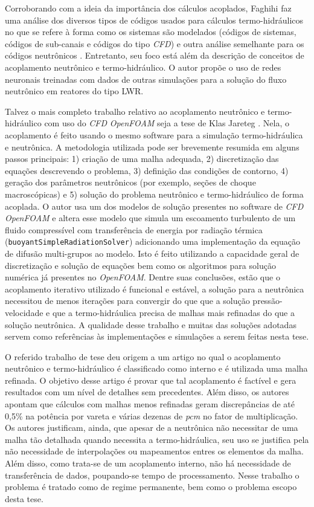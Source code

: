 Corroborando com a ideia da importância dos cálculos acoplados, Faghihi faz uma análise
dos diversos tipos de códigos usados para cálculos termo-hidráulicos no que se refere à
forma como os sistemas são modelados (códigos de sistemas, códigos de sub-canais e códigos
do tipo \textit{CFD}) e outra análise semelhante para os códigos neutrônicos \cite{Faghihi2011}. Entretanto, seu
foco está além da descrição de conceitos de acoplamento
neutrônico e termo-hidráulico. O autor propõe o uso de redes neuronais treinadas com dados de
outras simulações para a solução do fluxo neutrônico em reatores do tipo LWR.

Talvez o mais completo trabalho relativo ao acoplamento neutrônico e termo-hidráulico com uso do 
\textit{CFD} \textit{OpenFOAM} seja a tese de Klas Jareteg \cite{Jareteg2012}. Nela, o acoplamento é feito usando o mesmo 
software para a simulação termo-hidráulica e neutrônica. A metodologia utilizada pode ser brevemente 
resumida em alguns passos principais: 1) criação de uma malha adequada, 2) discretização das 
equações descrevendo o problema, 3) definição das condições de contorno, 4) geração dos 
parâmetros neutrônicos (por exemplo, seções de choque macroscópicas) e 5) solução do 
problema neutrônico e termo-hidráulico de forma acoplada. O autor usa um dos modelos de solução presentes no 
software de \textit{CFD} \textit{OpenFOAM} \cite{OpenFOAM2013} e 
altera esse modelo que simula um escoamento turbulento de um fluido compressível com transferência de energia
por radiação térmica (\texttt{buoyantSimpleRadiationSolver}) adicionando uma implementação da equação de difusão multi-grupos 
ao modelo. Isto é feito utilizando a capacidade geral de discretização e solução de equações bem como os algoritmos 
para solução numérica já presentes no \textit{OpenFOAM}. Dentre suas conclusões, estão que o acoplamento iterativo 
utilizado é funcional e estável, a solução para a neutrônica necessitou de menos iterações para convergir 
do que que a solução pressão-velocidade e que a termo-hidráulica precisa de malhas mais refinadas do que a solução 
neutrônica. A qualidade desse trabalho e muitas das soluções adotadas servem como referências às implementações 
e simulações a serem feitas nesta tese.

O referido trabalho de tese deu origem a um artigo \cite{Jareteg2014} no qual o acoplamento
neutrônico e termo-hidráulico é classificado como interno e é utilizada uma malha
refinada. O objetivo desse artigo é provar que
tal acoplamento é factível e gera resultados com um nível de detalhes sem precedentes. Além
disso, os autores apontam que cálculos com malhas menos refinadas geram discrepâncias
de até 0,5\% na potência por vareta e várias dezenas de \textit{pcm} no fator de multiplicação.
Os autores justificam, ainda, que apesar de a neutrônica não necessitar de uma malha
tão detalhada quando necessita a termo-hidráulica, seu uso se justifica pela não necessidade
de interpolações ou mapeamentos entres os elementos da malha. Além disso, como trata-se
de um acoplamento interno, não há necessidade de transferência de dados, poupando-se
tempo de processamento.
Nesse trabalho o problema é tratado como de regime permanente, bem como o problema escopo
desta tese.


